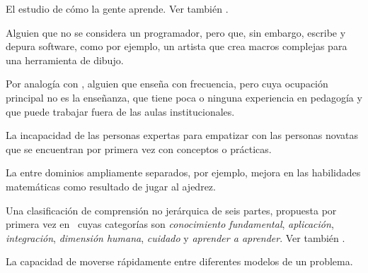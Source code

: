\begin{description}
 El estudio de cómo
la gente aprende. Ver también .




 Alguien que no se considera 
un programador, pero que, sin embargo, escribe y depura software, como por ejemplo, un artista que 
crea macros complejas para una herramienta de dibujo.

 Por analogía con
,
alguien que enseña con frecuencia, pero cuya ocupación principal no es la enseñanza, 
que tiene poca o ninguna experiencia en pedagogía y que puede trabajar fuera de las aulas institucionales.



 La incapacidad de las personas expertas 
para empatizar con las personas novatas que se encuentran por primera 
vez con conceptos o prácticas.












 La  entre dominios ampliamente separados, por ejemplo, mejora en las habilidades matemáticas como resultado de jugar al ajedrez.

 Una clasificación de comprensión no jerárquica 
de seis partes, propuesta por primera vez en~\cite{Fink2013} cuyas categorías son \emph{conocimiento fundamental}, \emph{aplicación}, \emph{integración}, \emph{dimensión humana}, \emph{cuidado} y 
\emph{aprender a aprender}. Ver también .






 La capacidad de moverse
rápidamente entre diferentes modelos de un problema.
























\end{description}
